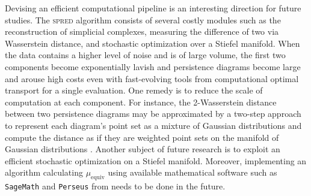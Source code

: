 \documentclass[11pt]{article}
\begin{document}
Devising an efficient computational pipeline is an interesting direction for future studies. The \textsc{spred} algorithm consists of several costly modules such as the reconstruction of simplicial complexes, measuring the difference of two via Wasserstein distance, and stochastic optimization over a Stiefel manifold. When the data contains a higher level of noise and is of large volume, the first two components become exponentially lavish and persistence diagrams become large and arouse high costs even with fast-evolving tools from computational optimal transport for a single evaluation. One remedy is to reduce the scale of computation at each component. For instance, the 2-Wasserstein distance between two persistence diagrams may be approximated by a two-step approach to represent each diagram's point set as a mixture of Gaussian distributions and compute the distance as if they are weighted point sets on the manifold of Gaussian distributions \citep{chen_optimal_2019-1}. Another subject of future research is to exploit an efficient stochastic optimization on a Stiefel manifold. Moreover, implementing an algorithm calculating $\mu_{\operatorname{equiv}}$ using available mathematical software such as \texttt{SageMath} \citep{sagemath} and \texttt{Perseus} from \cite{perseus} needs to be done in the future.





\end{document}
